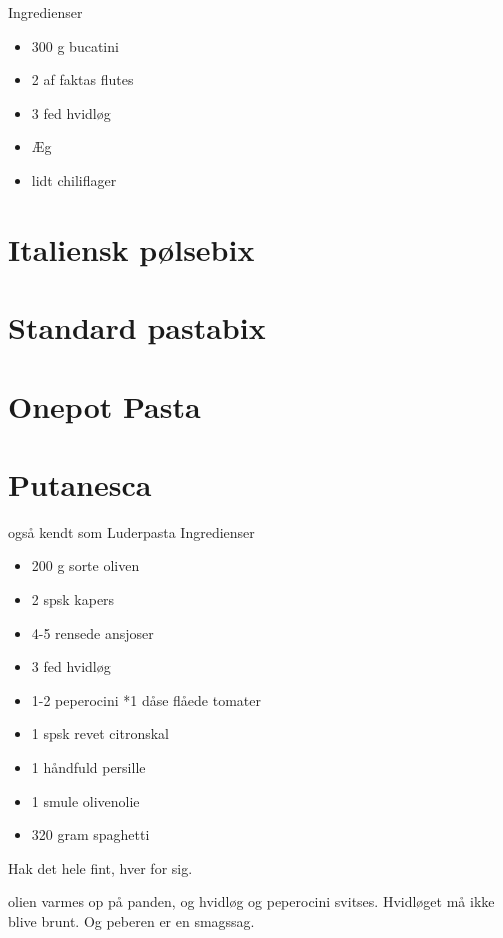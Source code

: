 \documentclass[
]{book}
\providecommand{\tightlist}{%
  \setlength{\itemsep}{0pt}\setlength{\parskip}{0pt}}
\begin{document}
Ingredienser

\begin{itemize}
\tightlist
\item
  300 g bucatini
\item
  2 af faktas flutes
\item
  3 fed hvidløg
\item
  Æg
\item
  lidt chiliflager
\end{itemize}

\section{Italiensk pølsebix}\label{italiensk-puxf8lsebix}

\section{Standard pastabix}\label{standard-pastabix}

\section{Onepot Pasta}\label{onepot-pasta}

\section{Putanesca}\label{putanesca}

også kendt som Luderpasta
Ingredienser

\begin{itemize}
\tightlist
\item
  200 g sorte oliven
\item
  2 spsk kapers
\item
  4-5 rensede ansjoser
\item
  3 fed hvidløg
\item
  1-2 peperocini
  *1 dåse flåede tomater
\item
  1 spsk revet citronskal
\item
  1 håndfuld persille
\item
  1 smule olivenolie
\item
  320 gram spaghetti
\end{itemize}

Hak det hele fint, hver for sig.

olien varmes op på panden, og hvidløg og peperocini svitses. Hvidløget må ikke blive brunt. Og peberen er en smagssag.
\end{document}
